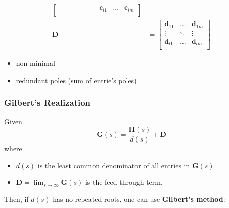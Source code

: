 \begin{align*}
\begin{bmatrix}
                       &                 &                 &       &                 &       &        & \mathbf{c}_{l1} & \dots & \mathbf{c}_{lm} \\
                  \end{bmatrix} \\
    \mathbf{D} & = \begin{bmatrix}
                       \mathbf{d}_{11} & \dots  & \mathbf{d}_{1m} \\
                       \vdots          & \ddots & \vdots          \\
                       \mathbf{d}_{l1} & \dots  & \mathbf{d}_{lm} \\
                   \end{bmatrix}
\end{align*}


\begin{itemize}
    \item non-minimal
    \item redundant poles (sum of entrie's poles)
\end{itemize}

\subsubsection{Gilbert's Realization}

Given
\begin{equation*}
    \mathbf{G}(s)=\frac{\mathbf{H}(s)}{d(s)}+\mathbf{D}
\end{equation*}
where
\begin{itemize}
    \item $d(s)$ is the least common denominator of all entries in $\mathbf{G}(s)$
    \item $\mathbf{D}=\lim_{s\to\infty}\mathbf{G}(s)$ is the feed-through term.
\end{itemize}

\newpar{}
Then, if $d(s)$ has no repeated roots, one can use \textbf{Gilbert's method}:

